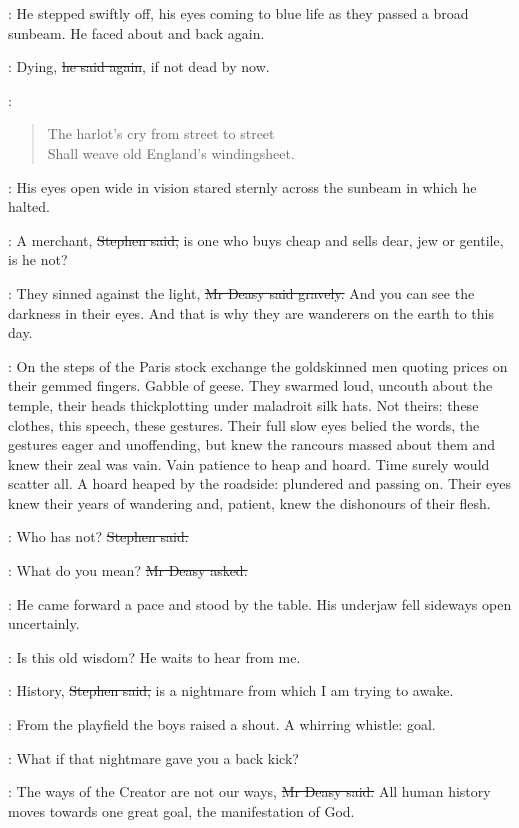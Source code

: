 :
He stepped swiftly off, his eyes coming to blue life
as they passed a broad sunbeam.
He faced about and back again.

\deasy:
Dying, \sout{he said again},
if not dead by now.

\StephenInt:
\begin{verse}
    The harlot's cry from street to street \\
    Shall weave old England's windingsheet.
\end{verse}

:
His eyes open wide in vision stared sternly across the sunbeam
in which he halted.

\Stephen:
A merchant, \sout{Stephen said,}
is one who buys cheap and sells dear,
jew or gentile,
is he not?

\deasy:
They sinned against the light,
\sout{Mr Deasy said gravely.}
And you can see the darkness in their eyes.
And that is why they are wanderers on the earth to this day.

\StephenInt:
On the steps of the Paris stock exchange
the goldskinned men quoting prices on their gemmed fingers.
Gabble of geese.
They swarmed loud, uncouth about the temple,
their heads thickplotting under maladroit silk hats.
Not theirs: these clothes, this speech, these gestures.
Their full slow eyes belied the words,
the gestures eager and unoffending,
but knew the rancours massed about them
and knew their zeal was vain.
Vain patience to heap and hoard.
Time surely would scatter all.
A hoard heaped by the roadside:
plundered and passing on.
Their eyes knew their years of wandering
and, patient, knew the dishonours of their flesh.

\Stephen:
Who has not?
\sout{Stephen said.}

\deasy:
What do you mean?
\sout{Mr Deasy asked.}

:
He came forward a pace and stood by the table.
His underjaw fell sideways open uncertainly.

\StephenInt:
Is this old wisdom?
He waits to hear from me.

\Stephen:
History, \sout{Stephen said,}
is a nightmare from which I am trying to awake.

:
From the playfield the boys raised a shout.
A whirring whistle: goal.

\StephenInt:
What if that nightmare gave you a back kick?

\deasy:
The ways of the Creator are not our ways, \sout{Mr Deasy said.}
All human history moves towards one great goal,
the manifestation of God.

